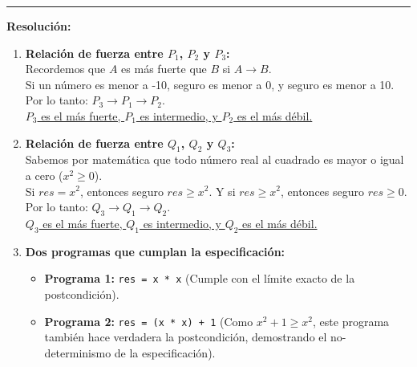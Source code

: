 \vspace{0.2cm}
{\color{gray}\hrule}
\vspace{0.4cm}

\textbf{Resolución:}

\begin{enumerate}[label=\textbf{\alph*)}]

    \item \textbf{Relación de fuerza entre $P_1$, $P_2$ y $P_3$:} \\
    Recordemos que $A$ es más fuerte que $B$ si $A \rightarrow B$. \\
    Si un número es menor a -10, seguro es menor a 0, y seguro es menor a 10. Por lo tanto: $P_3 \rightarrow P_1 \rightarrow P_2$. \\
    \underline{$P_3$ es el más fuerte, $P_1$ es intermedio, y $P_2$ es el más débil.}

    \vspace{0.4cm}
    \item \textbf{Relación de fuerza entre $Q_1$, $Q_2$ y $Q_3$:} \\
    Sabemos por matemática que todo número real al cuadrado es mayor o igual a cero ($x^2 \geq 0$). \\
    Si $res = x^2$, entonces seguro $res \geq x^2$. Y si $res \geq x^2$, entonces seguro $res \geq 0$. Por lo tanto: $Q_3 \rightarrow Q_1 \rightarrow Q_2$. \\
    \underline{$Q_3$ es el más fuerte, $Q_1$ es intermedio, y $Q_2$ es el más débil.}

    \vspace{0.4cm}
    \item \textbf{Dos programas que cumplan la especificación:}
    \begin{itemize}
        \item \textbf{Programa 1:} \texttt{res = x * x} (Cumple con el límite exacto de la postcondición).
        \item \textbf{Programa 2:} \texttt{res = (x * x) + 1} (Como $x^2 + 1 \geq x^2$, este programa también hace verdadera la postcondición, demostrando el no-determinismo de la especificación).
    \end{itemize}


\end{enumerate}

